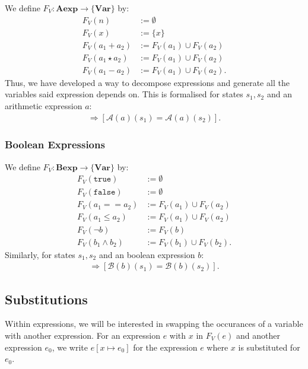 \documentclass[a4paper, 12pt, twoside]{article}
\begin{document}
We define $F_V : \textbf{Aexp} \to \{\textbf{Var}\}$ by: \begin{align*}
  F_V(n) &:= \emptyset \\
  F_V(x) &:= \{x\} \\
  F_V(a_1 + a_2) &:= F_V(a_1) \cup F_V(a_2) \\
  F_V(a_1 \star a_2) &:= F_V(a_1) \cup F_V(a_2) \\
  F_V(a_1 - a_2) &:= F_V(a_1) \cup F_V(a_2).
\end{align*} Thus, we have developed a way to decompose expressions
and generate all the variables said expression depends on. This
is formalised for states $s_1, s_2$ and an arithmetic expression 
$a$: \begin{gather*}
  [\forall x \in F_V(a)][s_1(x) = s_2(x)] \Longrightarrow 
  [\mathcal{A}(a)(s_1) = \mathcal{A}(a)(s_2)].
\end{gather*}

\subsubsection{Boolean Expressions}

We define $F_V : \textbf{Bexp} \to \{\textbf{Var}\}$ by: \begin{align*}
  F_V(\texttt{true}) &:= \emptyset \\
  F_V(\texttt{false}) &:= \emptyset \\
  F_V(a_1 == a_2) &:= F_V(a_1) \cup F_V(a_2) \\
  F_V(a_1 \leq a_2) &:= F_V(a_1) \cup F_V(a_2) \\
  F_V(\neg b) &:= F_V(b) \\
  F_V(b_1 \land b_2) &:= F_V(b_1) \cup F_V(b_2).
\end{align*} Similarly, for states $s_1, s_2$ and an boolean expression 
$b$: \begin{gather*}
  [\forall x \in F_V(b)][s_1(x) = s_2(x)] \Longrightarrow 
  [\mathcal{B}(b)(s_1) = \mathcal{B}(b)(s_2)].
\end{gather*}

\subsection{Substitutions}

Within expressions, we will be interested in swapping the occurances
of a variable with another expression. For an expression $e$ with
$x$ in $F_V(e)$ and another expression $e_0$, we write
$e[x\mapsto e_0]$ for the expression $e$ where $x$ is substituted
for $e_0$.
\end{document}
